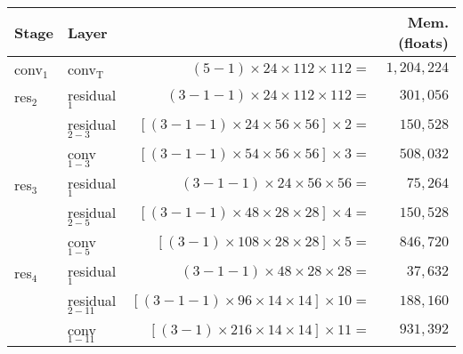 \begin{table}
\begin{center}
\begin{tabular}{llrr}
    \toprule
    \textbf{Stage}  & \textbf{Layer}        &                                                               & \textbf{Mem.} (floats) \\ 
    \midrule
    conv$_1$        & conv$_{\text{T}}$     & $(5-1) \times 24 \times 112 \times 112 =$                     & $1{,}204{,}224$ \\
    \midrule
    res$_2$         & residual$_1$          & $(3-1-1) \times 24 \times 112 \times 112 =$                     & $301{,}056$ \\
                    & residual$_{2-3}$      & $\left[(3-1-1) \times 24 \times 56 \times 56\right] \times 2 =$ & $150{,}528$ \\
                    & conv$_{1-3}$          & $\left[(3-1-1) \times 54 \times 56 \times 56\right] \times 3 =$ & $508{,}032$ \\
    \midrule
    res$_3$         & residual$_1$          & $(3-1-1) \times 24 \times 56 \times 56 =$                       & $75{,}264$ \\
                    & residual$_{2-5}$      & $\left[(3-1-1) \times 48 \times 28 \times 28\right] \times 4 =$ & $150{,}528$ \\
                    & conv$_{1-5}$          & $\left[(3-1) \times 108 \times 28 \times 28\right] \times 5 =$  & $846{,}720$ \\
    \midrule
    res$_4$         & residual$_1$          & $(3-1-1) \times 48 \times 28 \times 28 =$                        & $37{,}632$ \\
                    & residual$_{2-11}$     & $\left[(3-1-1) \times 96 \times 14 \times 14\right] \times 10 =$ & $188{,}160$ \\
                    & conv$_{1-11}$         & $\left[(3-1) \times 216 \times 14 \times 14\right] \times 11=$  & $931{,}392$ \\

\end{tabular}
\end{center}
\end{table}
